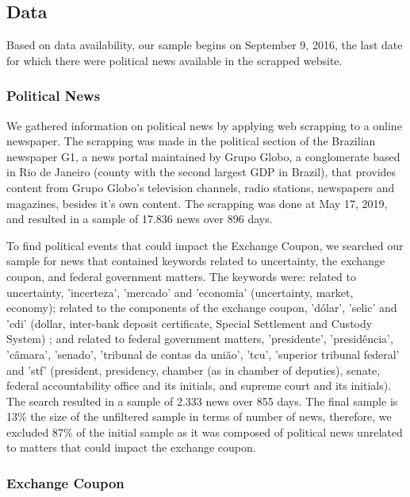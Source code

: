 \documentclass[a4paper]{article}
\begin{document}
\subsection{Data}


Based on data availability, our sample begins on September 9, 2016, the last date for which there were political news available in the scrapped website.


\subsubsection{Political News}


We gathered information on political news by applying web scrapping to a online newspaper. The scrapping was made in the political section of the Brazilian newspaper G1, a news portal maintained by Grupo Globo, a conglomerate based in Rio de Janeiro (county with the second largest GDP in Brazil), that provides content from Grupo Globo's television channels, radio stations, newspapers and magazines, besides it's own content. The scrapping was done at May 17, 2019, and resulted in a sample of 17.836 news over 896 days.


To find political events that could impact the Exchange Coupon,  we searched our sample for news that contained keywords related to uncertainty, the exchange coupon, and federal government matters. The keywords were: related to uncertainty, 'incerteza', 'mercado' and 'economia' (uncertainty, market, economy); related to the components of the exchange coupon, 'dólar', 'selic' and 'cdi' (dollar, inter-bank deposit certificate, Special Settlement and Custody System) ; and related to federal government matters, 'presidente', 'presidência', 'câmara', 'senado', 'tribunal de contas da união', 'tcu', 'superior tribunal federal' and 'stf' (president, presidency, chamber (as in chamber of deputies), senate, federal accountability office and its initials, and supreme court and its initials). The search resulted in a sample of 2.333 news over 855 days. The final sample is 13\% the size of the unfiltered sample in terms of number of news, therefore, we excluded 87\% of the initial sample as it was composed of political news unrelated to matters that could impact the exchange coupon.


\subsubsection{Exchange Coupon}
\end{document}
